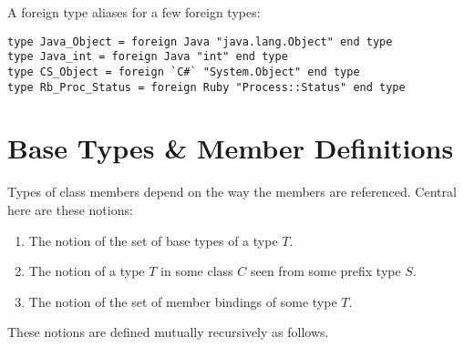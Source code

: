\example A foreign type aliases for a few foreign types:
\begin{lstlisting}
type Java_Object = foreign Java "java.lang.Object" end type
type Java_int = foreign Java "int" end type
type CS_Object = foreign `C#` "System.Object" end type
type Rb_Proc_Status = foreign Ruby "Process::Status" end type
\end{lstlisting}






\section{Base Types \& Member Definitions}
\label{sec:base-types}
\label{sec:member-definitions}

Types of class members depend on the way the members are referenced. Central here are these notions:
\begin{enumerate}
  \item The notion of the set of base types of a type $T$.
  \item The notion of a type $T$ in some class $C$ seen from some prefix type $S$.
  \item The notion of the set of member bindings of some type $T$. 
\end{enumerate}

These notions are defined mutually recursively as follows. 

